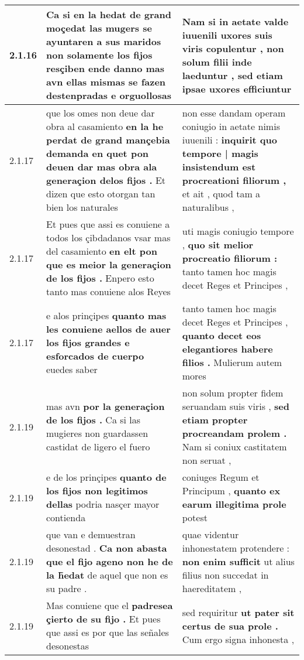 \begin{tabular}{|p{1cm}|p{6.5cm}|p{6.5cm}|}
2.1.16 & Ca si en la hedat de grand moçedat las mugers se ayuntaren a sus maridos \textbf{ non solamente los fijos resçiben ende danno } mas avn ellas mismas se fazen destenpradas e orguollosas & Nam si in aetate valde iuuenili uxores suis viris copulentur , \textbf{ non solum filii inde laeduntur , } sed etiam ipsae uxores efficiuntur \\\hline
2.1.17 & que los omes non deue dar obra al casamiento \textbf{ en la he perdat de grand mançebia demanda en quet pon deuen dar mas obra ala generaçion delos fijos . } Et dizen que esto otorgan tan bien los naturales & non esse dandam operam coniugio in aetate nimis iuuenili : \textbf{ inquirit quo tempore | magis insistendum est procreationi filiorum , } et ait , quod tam a naturalibus , \\\hline
2.1.17 & Et pues que assi es conuiene a todos los çibdadanos vsar mas del casamiento \textbf{ en elt pon que es meior la generaçion de los fijos . } Enpero esto tanto mas conuiene alos Reyes & uti magis coniugio tempore , \textbf{ quo sit melior procreatio filiorum : } tanto tamen hoc magis decet Reges et Principes , \\\hline
2.1.17 & e alos prinçipes \textbf{ quanto mas les conuiene aellos de auer los fijos grandes e esforcados de cuerpo } euedes saber & tanto tamen hoc magis decet Reges et Principes , \textbf{ quanto decet eos elegantiores habere filios . } Mulierum autem mores \\\hline
2.1.19 & mas avn \textbf{ por la generaçion de los fijos . } Ca si las mugieres non guardassen castidat de ligero el fuero & non solum propter fidem seruandam suis viris , \textbf{ sed etiam propter procreandam prolem . } Nam si coniux castitatem non seruat , \\\hline
2.1.19 & e de los prinçipes \textbf{ quanto de los fijos non legitimos dellas } podria nasçer mayor contienda & coniuges Regum et Principum , \textbf{ quanto ex earum illegitima prole } potest \\\hline
2.1.19 & que van e demuestran desonestad . \textbf{ Ca non abasta que el fijo ageno non he de la h̃edat } de aquel que non es su padre . & quae videntur inhonestatem protendere : \textbf{ non enim sufficit } ut alius filius non succedat in haereditatem , \\\hline
2.1.19 & Mas conuiene que el \textbf{ padresea çierto de su fijo . } Et pues que assi es por que las señales desonestas & sed requiritur \textbf{ ut pater sit certus de sua prole . } Cum ergo signa inhonesta , \\\hline

\end{tabular}
